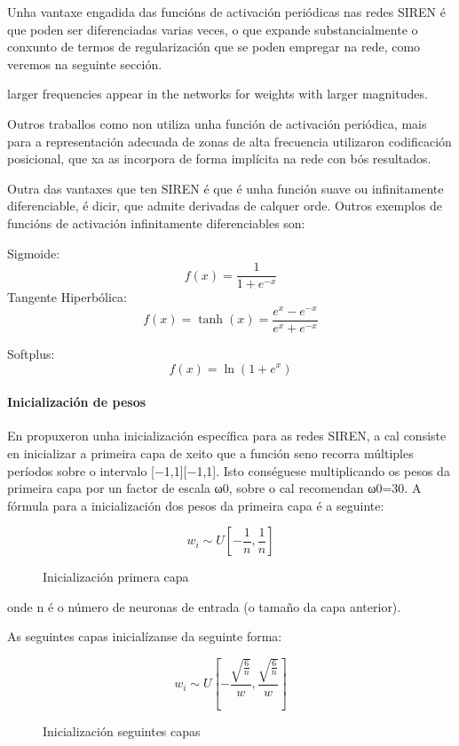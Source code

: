 Unha vantaxe engadida das funcións de activación periódicas nas redes SIREN é que poden ser diferenciadas varias veces, 
o que expande substancialmente o conxunto de termos de regularización que se poden empregar na rede, como veremos na seguinte sección.

larger frequencies appear in the networks for weights with larger magnitudes.

Outros traballos como \cite{mildenhall2020nerfrepresentingscenesneural} non utiliza unha función de activación periódica, mais para a representación adecuada de zonas de alta frecuencia 
utilizaron codificación posicional, que xa as incorpora de forma implícita na rede con bós resultados. 

Outra das vantaxes que ten SIREN é que é unha función suave ou infinitamente diferenciable, é dicir, que admite derivadas de calquer orde.
Outros exemplos de funcións de activación infinitamente diferenciables son:

Sigmoide:  
\[
f(x) = \frac{1}{1 + e^{-x}}
\]
Tangente Hiperbólica:  
\[
f(x) = \tanh(x) = \frac{e^x - e^{-x}}{e^x + e^{-x}}
\]

Softplus:  
\[
f(x) = \ln(1 + e^x)
\]


\paragraph{Inicialización de pesos}

En \cite{sitzmann2020implicitneuralrepresentationsperiodic} propuxeron unha inicialización específica para as redes SIREN, 
a cal consiste en inicializar a primeira capa de xeito que a función seno recorra múltiples períodos sobre o intervalo [−1,1][−1,1].
Isto conséguese multiplicando os pesos da primeira capa por un factor de escala ω0, sobre o cal recomendan ω0=30.
A fórmula para a inicialización dos pesos da primeira capa é a seguinte:

\begin{figure}[ht!]
    \centering
    \[
    w_i \sim U\left[ -\frac{1}{n}, \frac{1}{n} \right]
    \]

\caption{Inicialización primera capa}
\end{figure}

onde n é o número de neuronas de entrada (o tamaño da capa anterior).

As seguintes capas inicialízanse da seguinte forma:
\begin{figure}[ht!]
    \centering
    \[
    w_i \sim U\left[ -\frac{\sqrt{\frac{6}{n}}}{w}, \frac{\sqrt{\frac{6}{n}}}{w} \right]
    \]
    \caption{Inicialización seguintes capas}
\end{figure}

